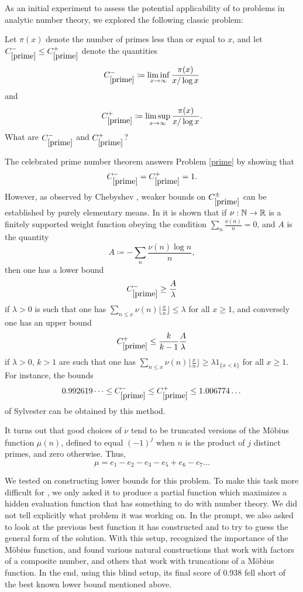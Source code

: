 As an initial experiment to assess the potential applicability of \AlphaEvolve to problems in analytic number theory, we explored the following classic problem:

\renewcommand{\problemURL}{https://google-deepmind.github.io/alphaevolve_repository_of_problems/problems/27.html}

\begin{problem}\label{prime}  Let $\pi(x)$ denote the number of primes less than or equal to $x$, and let $C_{\ref{prime}}^- \leq C_{\ref{prime}}^+$ denote the quantities
$$ C_{\ref{prime}}^- \coloneqq \liminf_{x \to \infty} \frac{\pi(x)}{x/\log x}$$
and
$$ C_{\ref{prime}}^+ \coloneqq \limsup_{x \to \infty} \frac{\pi(x)}{x/\log x}.$$
What are $C_{\ref{prime}}^-$ and $C_{\ref{prime}}^+$?
 \end{problem}

The celebrated prime number theorem answers Problem \ref{prime} by showing that
$$C_{\ref{prime}}^- = C_{\ref{prime}}^+ = 1.$$
However, as observed by Chebyshev \cite{chebyshev}, weaker bounds on $C_{\ref{prime}}^\pm$ can be established by purely elementary means.  In \cite[\S 3]{diamond} it is shown that if $\nu:\mathbb{N} \to \mathbb{R}$ is a finitely supported weight function obeying the condition $\sum_n \frac{\nu(n)}{n}=0$, and $A$ is the quantity 
$$A \coloneqq -\sum_n \frac{\nu(n)\log n}{n},$$
then one has a lower bound
$$ C_{\ref{prime}}^- \geq \frac{A}{\lambda} $$
if $\lambda > 0$ is such that one has $\sum_{n \leq x} \nu(n) \lfloor \frac{x}{n} \rfloor \leq \lambda$ for all $x \geq 1$, and conversely one has an upper bound
$$ C_{\ref{prime}}^+ \leq \frac{k}{k-1} \frac{A}{\lambda}$$
if $\lambda > 0$, $k > 1$ are such that one has $\sum_{n \leq x} \nu(n) \lfloor \frac{x}{n} \rfloor \geq \lambda 1_{\{x < k\}}$ for all $x \geq 1$.  For instance, the bounds
$$0.992619\dots \leq C_{\ref{prime}}^- \leq C_{\ref{prime}}^+ \leq 1.006774\dots$$
of Sylvester \cite{sylvester} can be obtained by this method.

It turns out that good choices of $\nu$ tend to be truncated versions of the M\"obius function $\mu(n)$, defined to equal $(-1)^j$ when $n$ is the product of $j$ distinct primes, and zero otherwise.  Thus,
$$ \mu = e_1 - e_2 - e_3 - e_5 + e_6 - e_7  \dots$$

We tested \AlphaEvolve on constructing lower bounds for this problem. To make this task more difficult for \AlphaEvolve, we only asked it to produce a partial function which maximizes a hidden evaluation function that has something to do with number theory. We did not tell \AlphaEvolve explicitly what problem it was working on. In the prompt, we also asked \AlphaEvolve to look at the previous best function it has constructed and to try to guess the general form of the solution.  With this setup, \AlphaEvolve recognized the importance of the M\"obius function, and found various natural constructions that work with factors of a composite number, and others that work with truncations of a M\"obius function. In the end, using this blind setup, its final score of 0.938 fell short of the best known lower bound mentioned above.

